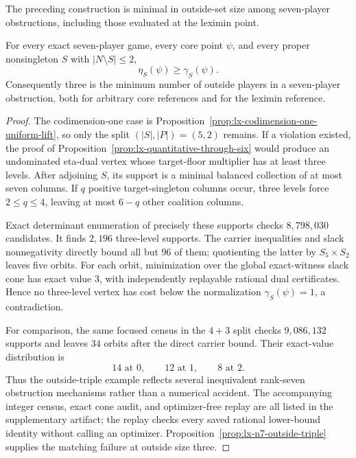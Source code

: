 The preceding construction is minimal in outside-set size among
seven-player obstructions, including those evaluated at the leximin point.

\begin{proposition}
\label{prop:lx-n7-outside-pair}
For every exact seven-player game, every core point $\psi$, and every proper
nonsingleton $S$ with $|N\setminus S|\leq2$,
\[
 \eta_S(\psi)\geq\gamma_S(\psi).
\]
Consequently three is the minimum number of outside players in a
seven-player obstruction, both for arbitrary core references and for the
leximin reference.
\end{proposition}

\begin{proof}
The codimension-one case is
Proposition~\ref{prop:lx-codimension-one-uniform-lift}, so only the split
$(|S|,|P|)=(5,2)$ remains.  If a violation existed, the proof of
Proposition~\ref{prop:lx-quantitative-through-six} would produce an
undominated eta-dual vertex whose target-floor multiplier has at least three
levels.  After adjoining $S$, its support is a minimal balanced collection
of at most seven columns.  If $q$ positive target-singleton columns occur,
three levels force $2\leq q\leq4$, leaving at most $6-q$ other coalition
columns.

Exact determinant enumeration of precisely these supports checks
$8{,}798{,}030$ candidates.  It finds $2{,}196$ three-level supports.  The
carrier inequalities and slack nonnegativity directly bound all but $96$ of
them; quotienting the latter by $S_5\times S_2$ leaves five orbits.  For each
orbit, minimization over the global exact-witness slack cone has exact value
$3$, with independently replayable rational dual certificates.  Hence no
three-level vertex has cost below the normalization
$\gamma_S(\psi)=1$, a contradiction.

For comparison, the same focused census in the $4+3$ split checks
$9{,}086{,}132$ supports and leaves $34$ orbits after the direct carrier
bound.  Their exact-value distribution is
\[
 14\text{ at }0,
 \qquad 12\text{ at }1,
 \qquad 8\text{ at }2.
\]
Thus the outside-triple example reflects several inequivalent rank-seven
obstruction mechanisms rather than a numerical accident.  The
accompanying integer census, exact cone audit, and optimizer-free replay are
all listed in the supplementary artifact; the replay checks every saved
rational lower-bound identity without calling an optimizer.
Proposition~\ref{prop:lx-n7-outside-triple} supplies the matching failure at
outside size three.
\end{proof}

